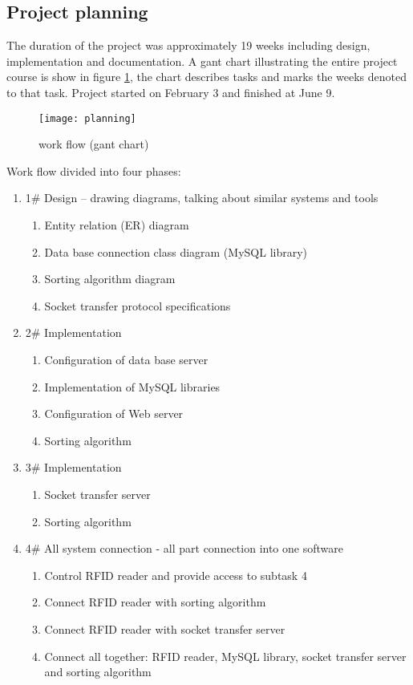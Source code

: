 \subsection{Project planning}

The duration of the project was approximately 19 weeks including design, implementation and documentation. A gant chart illustrating the entire project course is show in figure \ref{fig:planning}, the chart describes tasks and marks the weeks denoted to that task. Project started on February 3 and finished at June 9.

\begin{figure}[h]
	\centering
		\texttt{[image: planning]}
	\caption{work flow (gant chart)}
	\label{fig:planning}
\end{figure}

Work flow divided into four phases:

\begin{enumerate}
  \item 1\# Design – drawing diagrams, talking about similar systems and tools
  \begin{enumerate}
    \item Entity relation (ER) diagram
    \item Data base connection class diagram (MySQL library)
    \item Sorting algorithm diagram
    \item Socket transfer protocol specifications
  \end{enumerate}
  \item 2\# Implementation
  \begin{enumerate}
    \item Configuration of data base server
    \item Implementation of MySQL libraries
    \item Configuration of Web server
    \item Sorting algorithm
  \end{enumerate} 
  \item 3\# Implementation
  \begin{enumerate}
    \item Socket transfer server
    \item Sorting algorithm
  \end{enumerate}
  \item 4\# All system connection - all part connection into one software
  \begin{enumerate}
    \item Control RFID reader and provide access to subtask 4
    \item Connect RFID reader with sorting algorithm
    \item Connect RFID reader with socket transfer server
    \item Connect all together: RFID reader, MySQL library, socket transfer server and sorting algorithm
  \end{enumerate} 
\end{enumerate}

